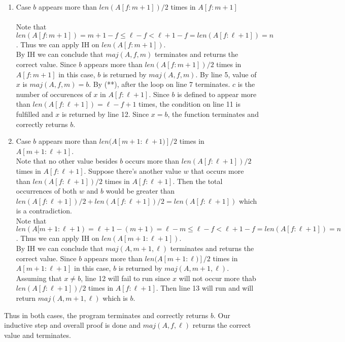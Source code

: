 \documentclass{article}
\begin{document}
\begin{enumerate}
\begin{enumerate}
\begin{enumerate}
\quad\begin{enumerate}
	\item[]Case $b$ appears more than $len(A[f:m+1])/2$ times in $A[f:m+1]$\\\\
	Note that $len(A[f:m+1]) = m + 1 - f \leq \ell - f < \ell + 1 - f = len(A[f:\ell+1]) = n $. Thus we can apply IH on $len(A[f:m+1])$.\\
 By IH we can conclude that  $maj(A,f,m)$ terminates and returns the correct value. Since  $b$ appears more than $len(A[f:m+1])/2$ times in $A[f:m+1]$ in this case, $b$ is returned by $maj(A,f,m)$. By line 5, value of $x$ is $maj(A,f,m) = b$. By (**), after the loop on line 7 terminates. $c$ is the number of occurences of $x$ in $A[f:\ell +1]$. Since $b$ is defined to appear more than $len(A[f:\ell+1]) = \ell -f +1$ times, the condition on line 11 is fulfilled and $x$ is returned by line 12. Since $x=b$, the function terminates and correctly returns $b$.\\
 
 \item[]Case $b$ appears more than $len(A[m+1:\ell+1)]/2$ times in $A[m+1:\ell +1]$.\\
 Note that no other value besides $b$ occurs more than $len(A[f:\ell +1])/2$ times in $A[f:\ell+1]$. Suppose there's another value $w$ that occurs more than $len(A[f:\ell +1])/2$ times in $A[f:\ell+1]$. Then the total occurrences of both $w$ and $b$ would be greater than $ len(A[f:\ell +1])/2 + len(A[f:\ell +1])/2 = len(A[f:\ell +1])$ which is a contradiction.\\
 Note that $len(A[m+1:\ell+1) = \ell + 1 -(m + 1)= \ell - m \leq \ell - f < \ell + 1 - f = len(A[f:\ell+1]) = n $. Thus we can apply IH on $len(A[m+1:\ell+1])$.\\
 By IH we can conclude that  $maj(A,m+1,\ell)$ terminates and  returns the correct value. Since  $b$ appears more than $len(A[m+1:\ell)]/2$ times in $A[m+1:\ell +1]$ in this case, $b$ is returned by $maj(A,m+1,\ell)$. Assuming that $x \neq b$, line 12 will fail to run since $x$ will not occur more thab $len(A[f:\ell +1])/2$ times in $A[f:\ell+1]$. Then line 13 will run and will return $maj(A,m+1,\ell)$ which is $b$.
\end{enumerate}
Thus in both cases, the program terminates and correctly returns $b$. Our inductive step and overall proof is done and $maj(A,f,\ell)$ returns the correct value and terminates.
\end{enumerate}
\end{enumerate}
\end{enumerate}
\end{document}
